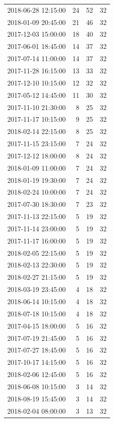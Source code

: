 \begin{tabular}{lrrr}
2018-06-28 12:15:00 & 24 & 52 & 32 \\
2018-01-09 20:45:00 & 21 & 46 & 32 \\
2017-12-03 15:00:00 & 18 & 40 & 32 \\
2017-06-01 18:45:00 & 14 & 37 & 32 \\
2017-07-14 11:00:00 & 14 & 37 & 32 \\
2017-11-28 16:15:00 & 13 & 33 & 32 \\
2017-12-10 10:15:00 & 12 & 32 & 32 \\
2017-05-12 14:45:00 & 11 & 30 & 32 \\
2017-11-10 21:30:00 & 8 & 25 & 32 \\
2017-11-17 10:15:00 & 9 & 25 & 32 \\
2018-02-14 22:15:00 & 8 & 25 & 32 \\
2017-11-15 23:15:00 & 7 & 24 & 32 \\
2017-12-12 18:00:00 & 8 & 24 & 32 \\
2018-01-09 11:00:00 & 7 & 24 & 32 \\
2018-01-19 19:30:00 & 7 & 24 & 32 \\
2018-02-24 10:00:00 & 7 & 24 & 32 \\
2017-07-30 18:30:00 & 7 & 23 & 32 \\
2017-11-13 22:15:00 & 5 & 19 & 32 \\
2017-11-14 23:00:00 & 5 & 19 & 32 \\
2017-11-17 16:00:00 & 5 & 19 & 32 \\
2018-02-05 22:15:00 & 5 & 19 & 32 \\
2018-02-13 22:30:00 & 5 & 19 & 32 \\
2018-02-27 21:15:00 & 5 & 19 & 32 \\
2018-03-19 23:45:00 & 4 & 18 & 32 \\
2018-06-14 10:15:00 & 4 & 18 & 32 \\
2018-07-18 10:15:00 & 4 & 18 & 32 \\
2017-04-15 18:00:00 & 5 & 16 & 32 \\
2017-07-19 21:45:00 & 5 & 16 & 32 \\
2017-07-27 18:45:00 & 5 & 16 & 32 \\
2017-10-17 14:15:00 & 5 & 16 & 32 \\
2018-02-06 12:45:00 & 5 & 16 & 32 \\
2018-06-08 10:15:00 & 3 & 14 & 32 \\
2018-08-19 15:45:00 & 3 & 14 & 32 \\
2018-02-04 08:00:00 & 3 & 13 & 32 \\

\end{tabular}
